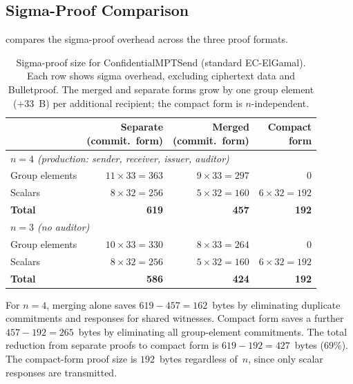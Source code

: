 \documentclass[11pt]{article}
\theoremstyle{definition}
\begin{document}
\subsection{Sigma-Proof Comparison}

 compares the sigma-proof overhead across
the three proof formats.

\begin{table}[htbp]
  \centering
  \caption{%
    Sigma-proof size for \textsf{ConfidentialMPTSend}
    (standard EC-ElGamal).
    Each row shows sigma overhead, excluding ciphertext data and
    Bulletproof.  The merged and separate forms grow by one group
    element ($+33$~B) per additional recipient; the compact form is
    $n$-independent.}
  \label{tab:sigma-comparison}
  \begin{tabular}{l@{\quad}rrr}
    \toprule
    & \shortstack{Separate\\(commit.\ form)}
    & \shortstack{Merged\\(commit.\ form)}
    & \shortstack{Compact\\form} \\
    \midrule
    \multicolumn{4}{l}{\textit{$n = 4$ (production: sender, receiver, issuer, auditor)}} \\[2pt]
    \quad Group elements
    & $11 \times 33 = 363$
    & $9 \times 33 = 297$
    & $0$ \\
    \quad Scalars
    & $8 \times 32 = 256$
    & $5 \times 32 = 160$
    & $6 \times 32 = 192$ \\
    \quad\textbf{Total}
    & \textbf{619}
    & \textbf{457}
    & \textbf{192} \\[4pt]
    \multicolumn{4}{l}{\textit{$n = 3$ (no auditor)}} \\[2pt]
    \quad Group elements
    & $10 \times 33 = 330$
    & $8 \times 33 = 264$
    & $0$ \\
    \quad Scalars
    & $8 \times 32 = 256$
    & $5 \times 32 = 160$
    & $6 \times 32 = 192$ \\
    \quad\textbf{Total}
    & \textbf{586}
    & \textbf{424}
    & \textbf{192} \\
    \bottomrule
  \end{tabular}
\end{table}

\noindent
For $n = 4$, merging alone saves $619 - 457 = 162$~bytes by
eliminating duplicate commitments and responses for shared witnesses.
Compact form saves a further $457 - 192 = 265$~bytes by eliminating
all group-element commitments.
The total reduction from separate proofs to compact form is
$619 - 192 = 427$~bytes ($69\%$).
The compact-form proof size is $192$~bytes regardless of~$n$, since
only scalar responses are transmitted.
\end{document}
